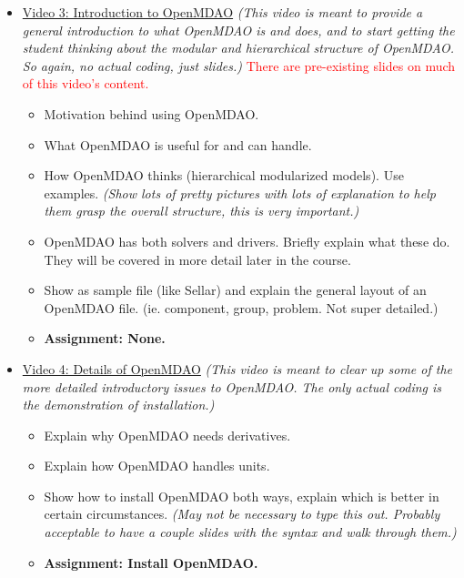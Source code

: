 \documentclass[12pt, letterpaper]{article}
\begin{document}
\begin{itemize}
	\item \underline{Video 3: Introduction to OpenMDAO} \textit{(This video is meant to provide a general introduction to what OpenMDAO is and does, and to start getting the student thinking about the modular and hierarchical structure of OpenMDAO. So again, no actual coding, just slides.)} \textcolor{red}{There are pre-existing slides on much of this video's content.}
		\begin{itemize}
			\item Motivation behind using OpenMDAO.
			\item What OpenMDAO is useful for and can handle.
			\item How OpenMDAO thinks (hierarchical modularized models). Use examples. \textit{(Show lots of pretty pictures with lots of explanation to help them grasp the overall structure, this is very important.)}
			\item OpenMDAO has both solvers and drivers. Briefly explain what these do. They will be covered in more detail later in the course.
			\item Show as sample file (like Sellar) and explain the general layout of an OpenMDAO file. (ie. component, group, problem. Not super detailed.)
			\item \textbf{Assignment: None.}
		\end{itemize}

	\item \underline{Video 4: Details of OpenMDAO} \textit{(This video is meant to clear up some of the more detailed introductory issues to OpenMDAO. The only actual coding is the demonstration of installation.)}
		\begin{itemize}
			\item Explain why OpenMDAO needs derivatives.
			\item Explain how OpenMDAO handles units.
			\item Show how to install OpenMDAO both ways, explain which is better in certain circumstances. \textit{(May not be necessary to type this out. Probably acceptable to have a couple slides with the syntax and walk through them.)}
			\item \textbf{Assignment: Install OpenMDAO.}
		\end{itemize}


\end{itemize}
\end{document}
